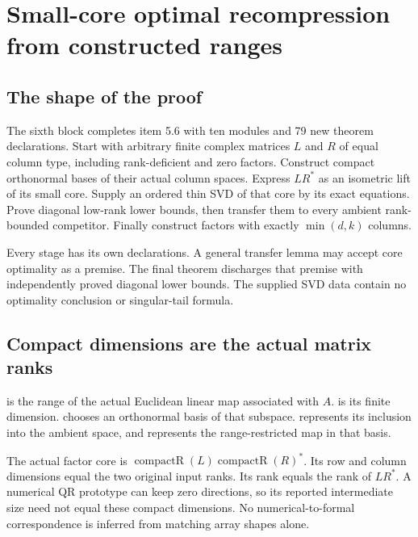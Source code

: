 \section{Small-core optimal recompression from constructed ranges}
\subsection{The shape of the proof}
The sixth block completes item 5.6 with ten modules and 79 new theorem declarations. Start with arbitrary finite complex matrices \(L\) and \(R\) of equal column type, including rank-deficient and zero factors. Construct compact orthonormal bases of their actual column spaces. Express \(LR^*\) as an isometric lift of its small core. Supply an ordered thin SVD of that core by its exact equations. Prove diagonal low-rank lower bounds, then transfer them to every ambient rank-bounded competitor. Finally construct factors with exactly \(\min(d,k)\) columns.

Every stage has its own declarations. A general transfer lemma may accept core optimality as a premise. The final theorem discharges that premise with independently proved diagonal lower bounds. The supplied SVD data contain no optimality conclusion or singular-tail formula.

\subsection{Compact dimensions are the actual matrix ranks}
 is the range of the actual Euclidean linear map associated with \(A\).  is its finite dimension.  chooses an orthonormal basis of that subspace.  represents its inclusion into the ambient space, and  represents the range-restricted map in that basis.

The actual factor core is \(\operatorname{compactR}(L)\operatorname{compactR}(R)^*\). Its row and column dimensions equal the two original input ranks. Its rank equals the rank of \(LR^*\). A numerical QR prototype can keep zero directions, so its reported intermediate size need not equal these compact dimensions. No numerical-to-formal correspondence is inferred from matching array shapes alone.

